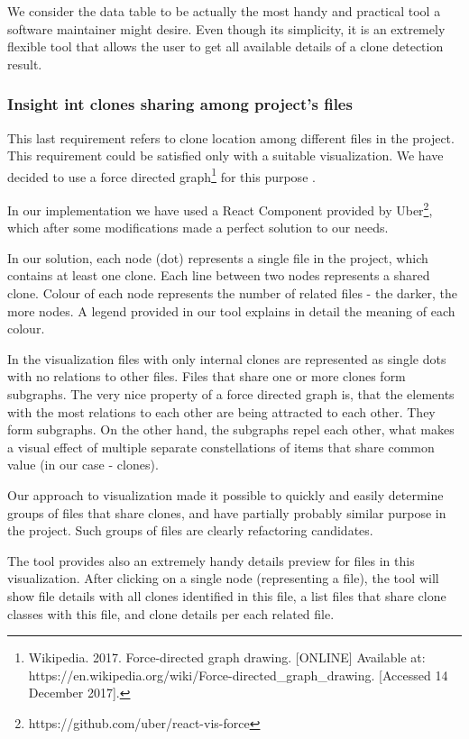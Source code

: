 \documentclass{uva-inf-article}
\begin{document}
We consider the data table to be actually the most handy and practical tool a software maintainer might desire. Even though its simplicity, it is an extremely flexible tool that allows the user to get   all available details of a clone detection result.

\subsubsection{Insight int clones sharing among project's files}
This last requirement refers to clone location among different files in the project. This requirement could be satisfied only with a suitable visualization. We have decided to use a force directed graph\footnote{Wikipedia. 2017. Force-directed graph drawing. [ONLINE] Available at: https://en.wikipedia.org/wiki/Force-directed\_graph\_drawing. [Accessed 14 December 2017].} for this purpose .

In our implementation we have used a React Component provided by Uber\footnote{https://github.com/uber/react-vis-force}, which after some modifications made a perfect solution to our needs. 

In our solution, each node (dot) represents a single file in the project, which contains at least one clone. Each line between two nodes represents a shared clone. Colour of each node represents the number of related files - the darker, the more nodes. A legend provided in our tool explains in detail the meaning of each colour. 

In the visualization files with only internal clones are represented as single dots with no relations to other files. Files that share one or more clones form subgraphs. The very nice property of a force directed graph is, that the elements with the most relations to each other are being attracted to each other. They form subgraphs. On the other hand, the subgraphs repel each other, what makes a visual effect of multiple separate constellations of items that share common value (in our case - clones). 

Our approach to visualization made it possible to quickly and easily determine groups of files that share clones, and have partially probably similar purpose in the project. Such groups of files are clearly refactoring candidates. 

The tool provides also an extremely handy details preview for files in this visualization. After clicking on a single node (representing a file), the tool will show file details with all clones identified in this file, a list files that share clone classes with this file, and clone details per each related file. 
\end{document}
